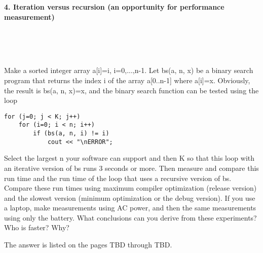\documentclass{article}
\begin{document}
\paragraph{}\
\paragraph{}\	
\paragraph{}\	
\paragraph{}\	
	
	
	
	\rmfamily
	
	\paragraph{4. Iteration versus recursion (an opportunity for performance measurement) }\
	
	\rmfamily\
	
		Make a sorted integer array a[i]=i, i=0,...,n-1.  Let bs(a, n, x) be a binary search program that returns the index i of the array a[0..n-1] where a[i]=x. Obviously, the result is bs(a, n, x)=x, and the binary search function can be tested using the loop
		
		\begin{verbatim}
for (j=0; j < K; j++)
    for (i=0; i < n; i++)
        if (bs(a, n, i) != i)
            cout << "\nERROR";
		\end{verbatim}
		
		
		Select the largest n your software can support and then K so that this loop with an iterative version of bs runs 3 seconds or more. Then measure and compare this run time and the run time of the loop that uses a recursive version of bs. Compare these run times using maximum compiler optimization (release version) and the slowest version (minimum optimization or the debug version). If you use a laptop, make measurements using AC power, and then the same measurements using only the battery. What conclusions can you derive from these experiments? Who is faster? Why?
		\newline
		
		The answer is listed on the pages TBD through TBD.
	
	
	
\paragraph{}\
\end{document}
